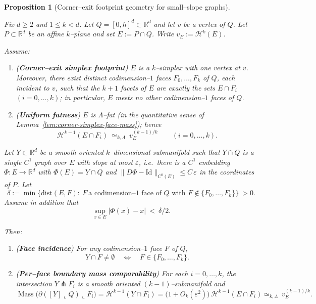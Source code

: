 \documentclass[11pt]{article}
\numberwithin{equation}{section}  %
\theoremstyle{plain}
\newtheorem{proposition}[theorem]{Proposition}
\theoremstyle{definition}
\theoremstyle{remark}
\newcommand{\R}{\mathbb{R}}
\DeclareMathOperator{\Mass}{Mass}
\newcommand{\dist}{\mathrm{dist}}
\begin{document}
\begin{proposition}[{Corner--exit footprint geometry for small--slope graphs}]\label{prop:holomorphic-corner-exit-g1g2}

Fix $d\ge 2$ and $1\le k<d$.  Let $Q=[0,h]^d\subset\R^d$ and let $v$ be a vertex of $Q$.
Let $P\subset\R^d$ be an affine $k$--plane and set $E:=P\cap Q$.
Write $v_E:=\mathcal H^k(E)$.

Assume:
\begin{enumerate}
\item[\textup{(H1)}]\label{H1corner}
(\textbf{Corner--exit simplex footprint})
$E$ is a $k$--simplex with one vertex at $v$.  Moreover, there exist \emph{distinct} codimension--$1$ faces
$F_0,\dots,F_k$ of $Q$, each incident to $v$, such that the $k\!+\!1$ facets of $E$ are exactly the sets $E\cap F_i$
$(i=0,\dots,k)$; in particular, $E$ meets no other codimension--$1$ faces of $Q$.

\item[\textup{(H2)}]\label{H2cornerfat}
(\textbf{Uniform fatness})
$E$ is $\Lambda$--fat (in the quantitative sense of Lemma~\ref{lem:corner-simplex-face-mass}); hence
\[
\mathcal H^{k-1}(E\cap F_i)\ \simeq_{k,\Lambda}\ v_E^{(k-1)/k}\qquad (i=0,\dots,k).
\]
\end{enumerate}

Let $Y\subset\R^d$ be a smooth oriented $k$--dimensional submanifold such that $Y\cap Q$ is a single $C^1$ graph over $E$
with slope at most $\varepsilon$, i.e.\ there is a $C^1$ embedding $\Phi:E\to\R^d$ with $\Phi(E)=Y\cap Q$ and
$\|D\Phi-\mathrm{Id}\|_{C^0(E)}\le C\,\varepsilon$ in the coordinates of $P$.
Let
\[
\delta:=\min\{\dist(E,F):\ F\ \text{a codimension--$1$ face of $Q$ with }F\notin\{F_0,\dots,F_k\}\}\ >0.
\]
Assume in addition that
\[
\sup_{x\in E}|\Phi(x)-x|\ <\ \delta/2.
\]

Then:
\begin{enumerate}
\item[\textup{(G1)}]\label{G1iff}
(\textbf{Face incidence})
For any codimension--$1$ face $F$ of $Q$,
\[
Y\cap F\neq\emptyset
\quad\Longleftrightarrow\quad
F\in\{F_0,\dots,F_k\}.
\]

\item[\textup{(G2)}]\label{G2mass}
(\textbf{Per--face boundary mass comparability})
For each $i=0,\dots,k$, the intersection $Y\pitchfork F_i$ is a smooth oriented $(k-1)$--submanifold and
\[
\Mass\bigl(\partial([Y]\llcorner Q)\llcorner F_i\bigr)
=\mathcal H^{k-1}(Y\cap F_i)
=\bigl(1+O_k(\varepsilon^2)\bigr)\,\mathcal H^{k-1}(E\cap F_i)
\simeq_{k,\Lambda}\ v_E^{(k-1)/k}.
\]
\end{enumerate}

\end{proposition}
\end{document}
